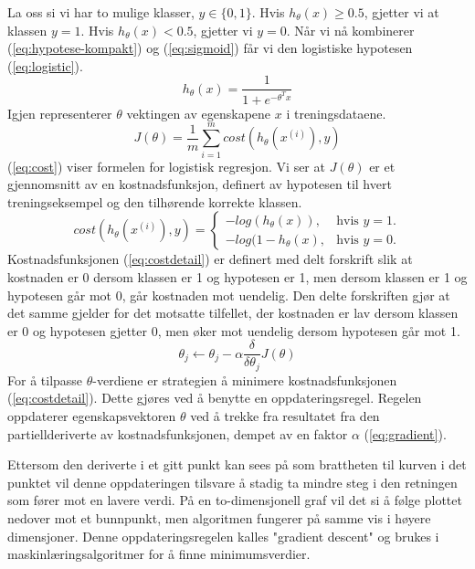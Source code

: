 La oss si vi har to mulige klasser, \(y \in \{0,1\}\). Hvis \( h_\theta(x) \geq  0.5\), gjetter vi at klassen \(y = 1\). Hvis \( h_\theta(x) < 0.5\), gjetter vi \(y = 0\). Når vi nå kombinerer (\ref{eq:hypotese-kompakt}) og (\ref{eq:sigmoid}) får vi den logistiske hypotesen (\ref{eq:logistic}).
\begin{equation}
h_\theta(x) = \frac{1}{1 + e^{-\theta^{T}x}}
\label{eq:logistic}
\end{equation}
Igjen representerer $\theta$ vektingen av egenskapene $x$ i treningsdataene. 
\begin{equation}
J(\theta) = 
    \frac{1}{m} \sum_{i=1}^{m} cost(h_\theta(x^{(i)}), y)
\label{eq:cost}
\end{equation}
(\ref{eq:cost}) viser formelen for logistisk regresjon. Vi ser at $J(\theta)$ er et gjennomsnitt av en kostnadsfunksjon, definert av hypotesen til hvert treningseksempel og den tilhørende korrekte klassen. 
\begin{equation}
    cost(h_\theta(x^{(i)}), y) = \begin{cases}
    -log(h_\theta(x)), & \text{hvis $y=1$}.\\
    -log(1-h_\theta(x), & \text{hvis $y=0$}.
  \end{cases}
  \label{eq:costdetail}
\end{equation}
Kostnadsfunksjonen (\ref{eq:costdetail}) er definert med delt forskrift slik at kostnaden er 0 dersom klassen er 1 og hypotesen er 1, men dersom klassen er 1 og hypotesen går mot 0, går kostnaden mot uendelig. Den delte forskriften gjør at det samme gjelder for det motsatte tilfellet, der kostnaden er lav dersom klassen er 0 og hypotesen gjetter 0, men øker mot uendelig dersom hypotesen går mot 1.
\begin{equation}
\theta_j \leftarrow \theta_j - \alpha \frac{\delta}{\delta\theta_j}J(\theta)
\label{eq:gradient}
\end{equation}
For å tilpasse $\theta$-verdiene er strategien å minimere kostnadsfunksjonen (\ref{eq:costdetail}). Dette gjøres ved å benytte en oppdateringsregel. Regelen oppdaterer egenskapsvektoren $\theta$ ved å trekke fra resultatet fra den partiellderiverte av kostnadsfunksjonen, dempet av en faktor $\alpha$ (\ref{eq:gradient}).

Ettersom den deriverte i et gitt punkt kan sees på som brattheten til kurven i det punktet vil denne oppdateringen tilsvare å stadig ta mindre steg i den retningen som fører mot en lavere verdi. På en to-dimensjonell graf vil det si å følge plottet nedover mot et bunnpunkt, men algoritmen fungerer på samme vis i høyere dimensjoner. Denne oppdateringsregelen kalles "gradient descent" og brukes i maskinlæringsalgoritmer for å finne minimumsverdier.

